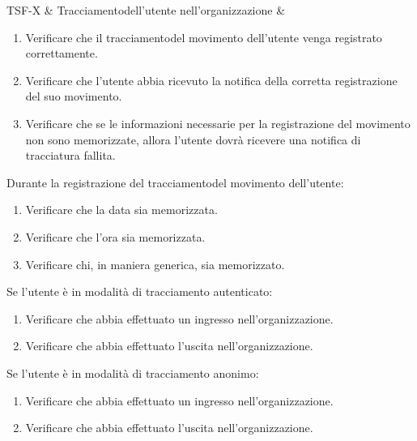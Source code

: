 TSF-X & Tracciamentodell'utente nell'organizzazione & \begin{enumerate}
    \item Verificare che il tracciamentodel movimento dell'utente venga registrato correttamente.
    \item Verificare che l'utente abbia ricevuto la notifica della corretta registrazione del suo movimento.
    \item Verificare che se le informazioni necessarie per la registrazione del movimento non sono memorizzate, allora l'utente dovrà ricevere una notifica di tracciatura fallita.
\end{enumerate}
Durante la registrazione del tracciamentodel movimento dell'utente:
\begin{enumerate}
    \item Verificare che la data sia memorizzata.
    \item Verificare che l'ora sia memorizzata.
    \item Verificare chi, in maniera generica, sia memorizzato.
\end{enumerate}
Se l'utente è in modalità di tracciamento autenticato:
\begin{enumerate}
    \item Verificare che abbia effettuato un ingresso nell'organizzazione.
    \item Verificare che abbia effettuato l'uscita nell'organizzazione.
\end{enumerate}
Se l'utente è in modalità di tracciamento anonimo:
\begin{enumerate}
    \item Verificare che abbia effettuato un ingresso nell'organizzazione.
    \item Verificare che abbia effettuato l'uscita nell'organizzazione.
\end{enumerate} \\

